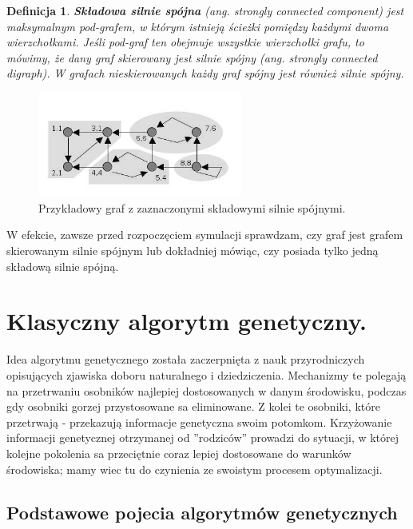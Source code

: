 \documentclass[twoside,12pt]{report}
\newtheorem{definition}{Definicja} %
\begin{document}
\vspace*{15px}

\begin{definition}
\textbf{Składowa silnie spójna} (ang. strongly connected component) jest maksymalnym pod-grafem, w którym istnieją ścieżki pomiędzy każdymi dwoma wierzchołkami. Jeśli pod-graf ten obejmuje wszystkie wierzchołki grafu, to mówimy, że dany graf skierowany jest silnie spójny (ang. strongly connected digraph). W grafach nieskierowanych każdy graf spójny jest również silnie spójny.
\end{definition}

\begin{figure}[ht]
\centering
\includegraphics[width=0.6\textwidth]{img/tajran}
\caption{Przykładowy graf z zaznaczonymi składowymi silnie spójnymi.}
\end{figure}

W efekcie, zawsze przed rozpoczęciem symulacji sprawdzam, czy graf jest grafem skierowanym silnie spójnym lub dokładniej mówiąc, czy posiada tylko jedną składową silnie spójną.

\section{Klasyczny algorytm genetyczny.}

Idea algorytmu genetycznego została zaczerpnięta z nauk przyrodniczych opisujących zjawiska doboru naturalnego i dziedziczenia. Mechanizmy te polegają na
przetrwaniu osobników najlepiej dostosowanych w danym środowisku, podczas gdy
osobniki gorzej przystosowane sa eliminowane. Z kolei te osobniki, które przetrwają
- przekazują informacje genetyczna swoim potomkom. Krzyżowanie informacji genetycznej otrzymanej od ”rodziców” prowadzi do sytuacji, w której kolejne pokolenia sa przeciętnie coraz lepiej dostosowane do warunków środowiska; mamy wiec tu do czynienia ze swoistym procesem optymalizacji. 

\subsection{Podstawowe pojecia algorytmów genetycznych}
\end{document}
